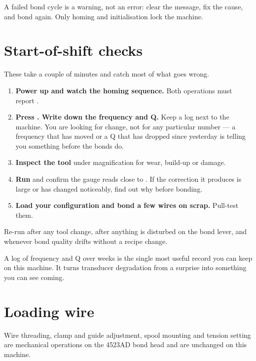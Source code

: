 A failed bond cycle is a warning, not an error: clear the message, fix the
cause, and bond again. Only homing and initialisation lock the machine.

\section{Start-of-shift checks}

These take a couple of minutes and catch most of what goes wrong.

\begin{enumerate}[leftmargin=*]
\item \textbf{Power up and watch the homing sequence.} Both operations must
  report .
\item \textbf{Press . Write down the frequency and Q.} Keep a log
  next to the machine. You are looking for change, not for any particular
  number --- a frequency that has moved or a Q that has dropped since
  yesterday is telling you something before the bonds do.
\item \textbf{Inspect the tool} under magnification for wear, build-up or
  damage.
\item \textbf{Run } and confirm the gauge reads close to
  . If the correction it produces is large or has changed
  noticeably, find out why before bonding.
\item \textbf{Load your configuration and bond a few wires on scrap.} Pull-test
  them.
\end{enumerate}

Re-run  after any tool change, after anything is disturbed on the
bond lever, and whenever bond quality drifts without a recipe change.

\begin{wbnote}
A log of frequency and Q over weeks is the single most useful record you can
keep on this machine. It turns transducer degradation from a surprise into
something you can see coming.
\end{wbnote}

\section{Loading wire}

Wire threading, clamp and guide adjustment, spool mounting and tension setting
are mechanical operations on the 4523AD bond head and are unchanged on this
machine.

